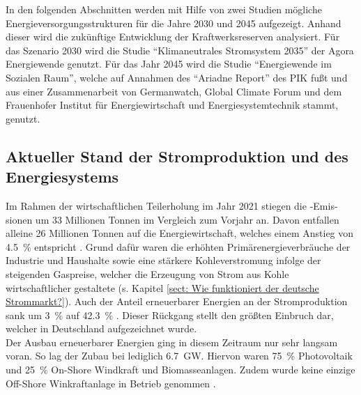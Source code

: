 	In den folgenden Abschnitten werden mit Hilfe von zwei Studien mögliche Energieversorgungsstrukturen für die Jahre 2030 und 2045 aufgezeigt.
	Anhand dieser wird die zukünftige Entwicklung der Kraftwerksreserven analysiert.
	Für das Szenario 2030 wird die Studie "`Klimaneutrales Stromsystem 2035"' der Agora Energiewende genutzt.
	Für das Jahr 2045 wird die Studie "`Energiewende im Sozialen Raum"', welche auf Annahmen des "`Ariadne Report"' des PIK fußt und aus einer Zusammenarbeit von Germanwatch, Global Climate Forum und dem Frauenhofer Institut für Energiewirtschaft und Energiesystemtechnik stammt, genutzt.

	\subsection{Aktueller Stand der Stromproduktion und des Energiesystems}
	
		Im Rahmen der wirtschaftlichen Teilerholung im Jahr 2021 stiegen die \COO-Emis-sionen um 33 Millionen Tonnen im Vergleich zum Vorjahr an.
		Davon entfallen alleine 26 Millionen Tonnen auf die Energiewirtschaft, welches einem  Anstieg von \SI{4,5}{\percent} entspricht \cite[S.5]{Stand_der_Dinge}. 
		Grund dafür waren die erhöhten Primärenergieverbräuche der Industrie und Haushalte sowie eine stärkere Kohleverstromung infolge der steigenden Gaspreise, welcher die Erzeugung von Strom aus Kohle wirtschaftlicher gestaltete (s. Kapitel \ref{sect: Wie funktioniert der deutsche Strommarkt?}). 
		Auch der Anteil erneuerbarer Energien an der Stromproduktion sank um \SI{3}{\percent} auf \SI{42,3}{\percent} \cite[S.5]{Stand_der_Dinge}.
		Dieser Rückgang stellt den größten Einbruch dar, welcher in Deutschland aufgezeichnet wurde. \\
		
		Der Ausbau erneuerbarer Energien ging in diesem Zeitraum nur sehr langsam voran. 
		So lag der Zubau bei lediglich \SI{6,7}{\giga\watt}. 
		Hiervon waren \SI{75}{\percent} Photovoltaik und \SI{25}{\percent} On-Shore Windkraft und Biomasseanlagen. 
		Zudem wurde keine einzige Off-Shore Winkraftanlage in Betrieb genommen \cite[S.47 ff.]{Stand_der_Dinge}. 
	
